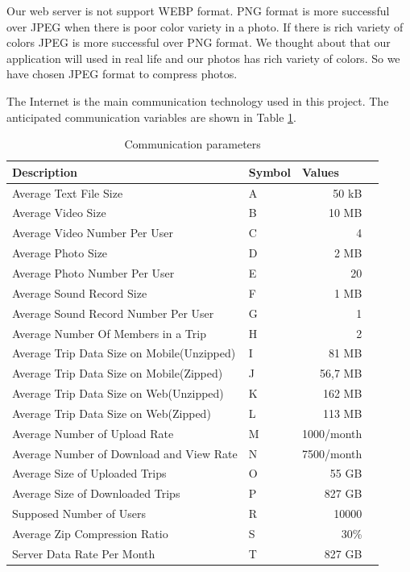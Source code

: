 Our web server is not support WEBP format. PNG format is more successful over JPEG when there is poor color variety in a photo. If there is rich variety of colors JPEG is more successful over PNG format. We thought about that our application will used in real life and our photos has rich variety of colors. So we have chosen JPEG format to compress photos.

The Internet is the main communication technology used in this project. The
anticipated communication variables are shown in Table \ref{table:commparameters}.

\newpage
\begin{table}[!ht]
\centering
\caption{Communication parameters}
\label{table:commparameters}
\begin{tabular}{|l|l|r|r|}
\hline
\textbf{Description}                                                                   & \multicolumn{1}{l|}{\textbf{Symbol}} & \multicolumn{1}{l|}{\textbf{Values}} \\ \hline
Average Text File Size & A  & 50 kB \\ \hline
Average Video Size & B & 10 MB \\ \hline
Average Video Number Per User & C & 4 \\ \hline
Average Photo Size & D & 2 MB \\ \hline
Average Photo Number Per User & E & 20 \\ \hline
Average Sound Record Size & F & 1 MB \\ \hline
Average Sound Record Number Per User & G & 1 \\ \hline
Average Number Of Members in a Trip & H & 2 \\ \hline
Average Trip Data Size on Mobile(Unzipped) & I & 81 MB \\ \hline
Average Trip Data Size on Mobile(Zipped) & J & 56,7 MB \\ \hline
Average Trip Data Size on Web(Unzipped) & K & 162 MB \\ \hline
Average Trip Data Size on Web(Zipped) & L & 113 MB \\ \hline
Average Number of Upload Rate & M & 1000/month \\ \hline
Average Number of Download and View Rate & N & 7500/month \\ \hline
Average Size of Uploaded Trips & O & 55 GB \\ \hline
Average Size of Downloaded Trips  & P & 827 GB \\ \hline
Supposed Number of Users  & R & 10000 \\ \hline
Average Zip Compression Ratio & S & 30\% \cite{zip} \\ \hline
Server Data Rate Per Month & T & 827 GB \\ \hline
\end{tabular}
\end{table}



